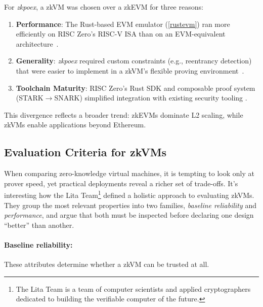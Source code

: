 For \textit{zkpoex}, a zkVM was chosen over a zkEVM for three reasons:
\begin{enumerate}
    \item \textbf{Performance}: The Rust-based EVM emulator (\ref{rustevm}) ran more efficiently on RISC Zero's RISC-V ISA than on an EVM-equivalent architecture~\cite{turn0search9}.
    
    \item \textbf{Generality}: \textit{zkpoex} required custom constraints (e.g., reentrancy detection) that were easier to implement in a zkVM's flexible proving environment~\cite{turn0search10,turn0search11}.
    
    \item \textbf{Toolchain Maturity}: RISC Zero's Rust SDK and composable proof system (STARK$\rightarrow$SNARK) simplified integration with existing security tooling \cite{risc0_design_blog}.
\end{enumerate}

This divergence reflects a broader trend: zkEVMs dominate L2 scaling, while zkVMs enable applications beyond Ethereum.

\subsection{Evaluation Criteria for zkVMs}\label{subsec:zkvm_eval}
When comparing zero-knowledge virtual machines, it is tempting to look only at prover speed, yet practical deployments reveal a richer set of trade-offs.  
It's interesting how the Lita Team\footnote{The Lita Team is a team of computer scientists and applied cryptographers dedicated to building the verifiable computer of the future.} defined a holistic approach to evaluating zkVMs. They group the most relevant properties into two families, \textit{baseline reliability} and \textit{performance}, and argue that both must be inspected before declaring one design “better” than another.

\paragraph{Baseline reliability:}
These attributes determine whether a zkVM can be trusted at all.

